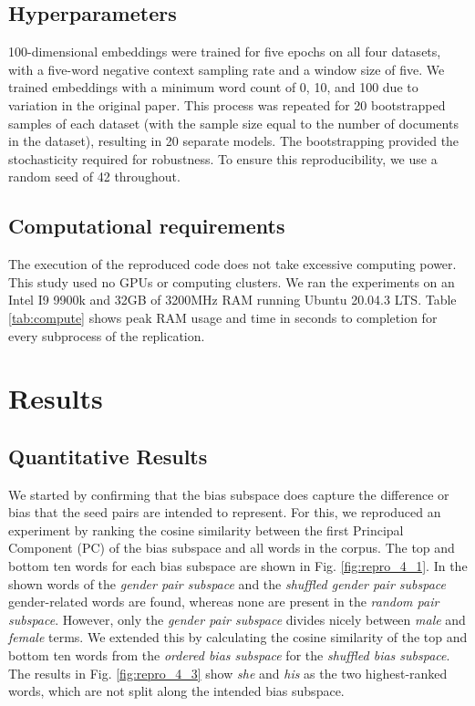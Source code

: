 \subsection{Hyperparameters} 100-dimensional embeddings were trained for five epochs on all four
datasets, with a five-word negative context sampling rate and a window size of five. We trained
embeddings with a minimum word count of 0, 10, and 100 due to variation in the original paper. This
process was repeated for 20 bootstrapped samples of each dataset (with the sample size equal to the
number of documents in the dataset), resulting in 20 separate models. The bootstrapping provided the
stochasticity required for robustness. To ensure this reproducibility, we use a random seed of 42
throughout.

\subsection{Computational requirements} The execution of the reproduced code does not take excessive
computing power. This study used no GPUs or computing clusters. We ran the experiments on an Intel
I9 9900k and 32GB of 3200MHz RAM running Ubuntu 20.04.3 LTS. Table \ref{tab:compute} shows peak RAM
usage and time in seconds to completion for every subprocess of the replication.

\section{Results} \label{sec:results}

\subsection{Quantitative Results} We started by confirming that the bias subspace does capture the
difference or bias that the seed pairs are intended to represent. For this, we reproduced an
experiment by \citet{antoniak-mimno-2021-bad} ranking the cosine similarity between the first
Principal Component (PC) of the bias subspace and all words in the corpus. The top and bottom ten
words for each bias subspace are shown in Fig. \ref{fig:repro_4_1}. In the shown words of the
\textit{gender pair subspace} and the \textit{shuffled gender pair subspace} gender-related words
are found, whereas none are present in the \textit{random pair subspace}. However, only the
\textit{gender pair subspace} divides nicely between \textit{male} and \textit{female} terms. We
extended this by calculating the cosine similarity of the top and bottom ten words from the
\textit{ordered bias subspace} for the \textit{shuffled bias subspace}. The results in Fig.
\ref{fig:repro_4_3} show \textit{she} and \textit{his} as the two highest-ranked words, which are
not split along the intended bias subspace.

